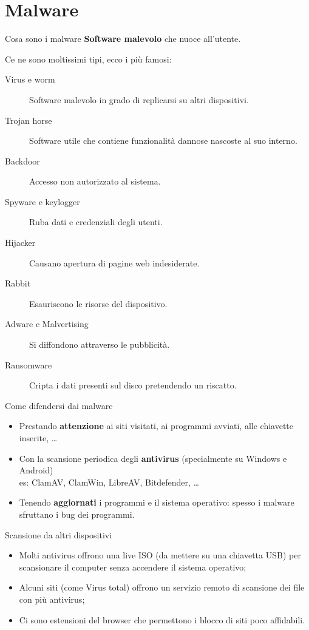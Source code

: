 
\section{Malware}

\begin{myframe}{Cosa sono i malware}
  \textbf{Software malevolo} che nuoce all'utente.

  \pause
  Ce ne sono moltissimi tipi, ecco i più  famosi:
  \begin{description}
    \item[Virus e worm] Software malevolo in grado di replicarsi su altri dispositivi.
    \item[Trojan horse] Software utile che contiene funzionalità dannose nascoste al suo interno.
    \item[Backdoor] Accesso non autorizzato al sistema.
    \item[Spyware e keylogger] Ruba dati e credenziali degli utenti.
    \item[Hijacker] Causano apertura di pagine web indesiderate.
    \item[Rabbit] Esauriscono le risorse del dispositivo.
    \item[Adware e Malvertising] Si diffondono attraverso le pubblicità.
    \item[Ransomware] Cripta i dati presenti sul disco pretendendo un riscatto.
  \end{description}
\end{myframe}

\begin{myframe}{Come difendersi dai malware}
  \begin{itemize}[<+->]
    \item Prestando \textbf{attenzione} ai siti visitati, ai programmi avviati, alle chiavette inserite, \dots
    \item Con la scansione periodica degli \textbf{antivirus} (specialmente su Windows e Android)\\
    es: ClamAV, ClamWin, LibreAV, Bitdefender, \dots
    \item Tenendo \textbf{aggiornati} i programmi e il sistema operativo: spesso i malware sfruttano i bug dei programmi.
  \end{itemize}
\end{myframe}

\begin{myframe}{Scansione da altri dispositivi}
  \begin{itemize}[<+->]
    \item Molti antivirus offrono una live ISO (da mettere su una chiavetta USB) per scansionare il computer senza accendere il sistema operativo;
    \item Alcuni siti (come Virus total) offrono un servizio remoto di scansione dei file con più antivirus;
    \item Ci sono estensioni del browser che permettono i blocco di siti poco affidabili.
  \end{itemize}
\end{myframe}

